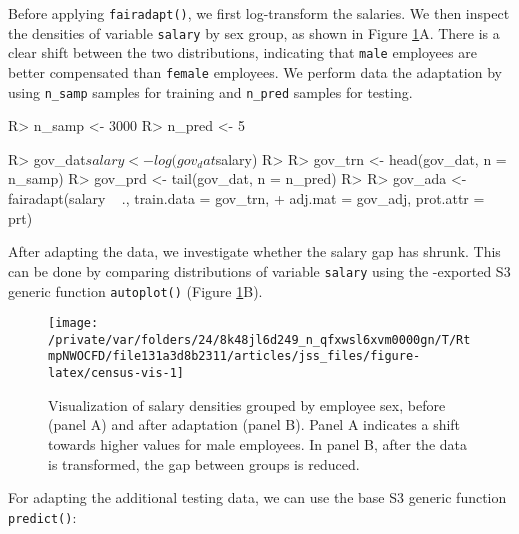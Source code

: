 \documentclass[
  nojss]{jss}
\begin{document}
Before applying \texttt{fairadapt()}, we first log-transform the
salaries. We then inspect the densities of variable \texttt{salary} by
sex group, as shown in Figure \ref{fig:census-vis}A. There is a clear
shift between the two distributions, indicating that \texttt{male}
employees are better compensated than \texttt{female} employees. We
perform data the adaptation by using \texttt{n\_samp} samples for
training and \texttt{n\_pred} samples for testing.

\begin{CodeChunk}
\begin{CodeInput}
R> n_samp <- 3000
R> n_pred <- 5
\end{CodeInput}
\end{CodeChunk}

\begin{CodeChunk}
\begin{CodeInput}
R> gov_dat$salary <- log(gov_dat$salary)
R> 
R> gov_trn <- head(gov_dat, n = n_samp)
R> gov_prd <- tail(gov_dat, n = n_pred)
R> 
R> gov_ada <- fairadapt(salary ~ ., train.data = gov_trn,
+                      adj.mat = gov_adj, prot.attr = prt)
\end{CodeInput}
\end{CodeChunk}

After adapting the data, we investigate whether the salary gap has
shrunk. This can be done by comparing distributions of variable
\texttt{salary} using the -exported S3 generic function
\texttt{autoplot()} (Figure \ref{fig:census-vis}B).

\begin{CodeChunk}
\begin{figure}

{\centering \texttt{[image: /private/var/folders/24/8k48jl6d249\_n\_qfxwsl6xvm0000gn/T/RtmpNWOCFD/file131a3d8b2311/articles/jss\_files/figure-latex/census-vis-1]} 

}

\caption[Visualization of salary densities grouped by employee sex, before (panel A) and after adaptation (panel B)]{Visualization of salary densities grouped by employee sex, before (panel A) and after adaptation (panel B). Panel A indicates a shift towards higher values for male employees. In panel B, after the data is transformed, the gap between groups is reduced.}\label{fig:census-vis}
\end{figure}
\end{CodeChunk}

For adapting the additional testing data, we can use the base
 S3 generic function \texttt{predict()}:
\end{document}
